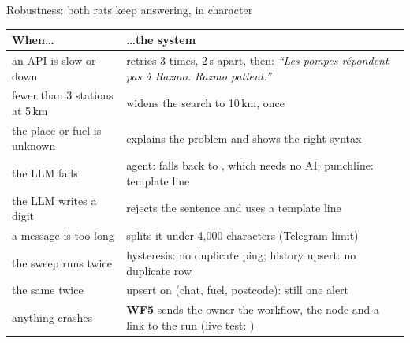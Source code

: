 \documentclass[aspectratio=169,11pt]{beamer}
\newcommand{\cmd}[1]{\leavevmode{\ttfamily\color{ratzpurple}#1}}
\begin{document}
\begin{frame}{Robustness: both rats keep answering, in character}
  \small\renewcommand{\arraystretch}{1.3}
  \begin{tabular}{@{}p{4.3cm}p{9.6cm}@{}}
    \toprule
    \textbf{When\ldots} & \textbf{\ldots the system} \\
    \midrule
    an API is slow or down & retries 3 times, 2\,s apart, then: \emph{``Les pompes répondent pas à Razmo. Razmo patient.''}\\
    fewer than 3 stations at 5\,km & widens the search to 10\,km, once\\
    the place or fuel is unknown & explains the problem and shows the right syntax\\
    the LLM fails & agent: falls back to \cmd{/plein}, which needs no AI; punchline: template line\\
    the LLM writes a digit & rejects the sentence and uses a template line\\
    a message is too long & splits it under 4,000 characters (Telegram limit)\\
    the sweep runs twice & hysteresis: no duplicate ping; history upsert: no duplicate row\\
    the same \cmd{/alerte} twice & upsert on (chat, fuel, postcode): still one alert\\
    anything crashes & \textbf{WF5} sends the owner the workflow, the node and a link to the run (live test: \cmd{/panne})\\
    \bottomrule
  \end{tabular}
\end{frame}
\end{document}
